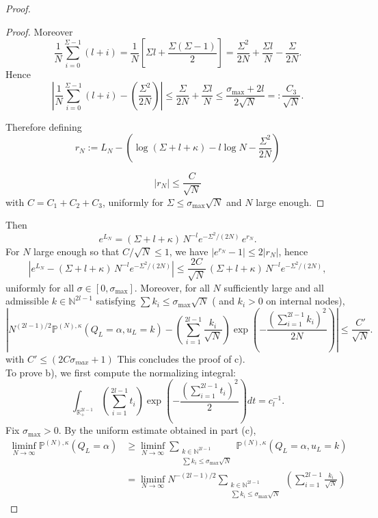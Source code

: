 \documentclass[11pt]{article}
\begin{document}
\begin{proof}
\begin{proof}
\noindent
Moreover
\[
\frac1N\sum_{i=0}^{\Sigma-1}(l+i)
=
\frac1N\left[\Sigma l+\frac{\Sigma(\Sigma-1)}2\right]=
\frac{\Sigma^2}{2N}
+\frac{\Sigma l}{N}
-\frac{\Sigma}{2N}.
\]
\medskip
\noindent
Hence
\[
\left|
\frac1N\sum_{i=0}^{\Sigma-1}(l+i)
-
\left(\frac{\Sigma^2}{2N}\right)
\right|
\leq
\frac{\Sigma}{2N}+\frac{\Sigma l}{N}
\le
\frac{\sigma_{\max}+2l}{2\sqrt N}
=: \frac{C_3}{\sqrt N}.
\]

\medskip
\noindent
Therefore defining
\[
r_N:=L_N-
\left(\log(\Sigma+l+\kappa)-l\log N-\frac{\Sigma^2}{2N}\right)\]

\[ \left| r_N \right|
\le
\frac{C}{\sqrt N}
\]
with $C=C_1+C_2+C_3$,
uniformly for $\Sigma\le\sigma_{\max}\sqrt N$ and $N$ large enough.
\end{proof}

\medskip
\noindent
Then
\[
e^{L_N}=(\Sigma+l+\kappa)\,N^{-l}e^{-\Sigma^2/(2N)}\,e^{r_N}.
\]
For $N$ large enough so that $C/\sqrt N\le 1$, we have $|e^{r_N}-1|\le 2|r_N|$, hence
\[
\left|e^{L_N}-(\Sigma+l+\kappa)\,N^{-l}e^{-\Sigma^2/(2N)}\right|
\le \frac{2C}{\sqrt N}\,(\Sigma+l+\kappa)\,N^{-l}e^{-\Sigma^2/(2N)},
\]
uniformly for all $\sigma\in[0,\sigma_{\max}]$.
 Moreover, 
 for all $N$ sufficiently large and all admissible
$k\in\mathbb N^{2l-1}$ satisfying $\sum k_i\le \sigma_{\max}\sqrt N$ ( and $k_i >0$ on internal nodes),
\[
\left|
N^{(2l-1)/2}
\mathbb P^{(N),\kappa}(Q_L=\alpha,u_L=k)
-
\left(\sum_{i=1}^{2l-1}\frac{k_i}{\sqrt N}\right)
\exp\!\left(-\frac{(\sum_{i=1}^{2l-1}k_i)^2}{2N}\right)
\right|
\le \frac{C'}{\sqrt N}.
\]
with $C'\le (2C\sigma_{max}+1)$ This concludes the proof of c).\\
\medskip
\noindent
To prove b), we first compute the normalizing integral:
\[
\int_{\mathbb R_+^{2l-1}}
\left(\sum_{i=1}^{2l-1} t_i\right)
\exp\!\left(-\frac{(\sum_{i=1}^{2l-1} t_i)^2}{2}\right)
dt
=
c_l^{-1}.
\]
\medskip
\noindent
Fix $\sigma_{\max}>0$. By the uniform estimate obtained in part (c),
\begin{align*}
\liminf_{N\to\infty}
\mathbb P^{(N),\kappa}(Q_L=\alpha)
&\ge
\liminf_{N\to\infty}
\sum_{\substack{k\in\mathbb N^{2l-1}\\ \sum k_i\le \sigma_{\max}\sqrt N}}
\mathbb P^{(N),\kappa}(Q_L=\alpha,u_L=k)
\\
&=
\liminf_{N\to\infty}
N^{-(2l-1)/2}
\sum_{\substack{k\in\mathbb N^{2l-1}\\ \sum k_i\le \sigma_{\max}\sqrt N}}
\left(\sum_{i=1}^{2l-1}\frac{k_i}{\sqrt N}\right)

\end{align*}
\end{proof}
\end{document}
